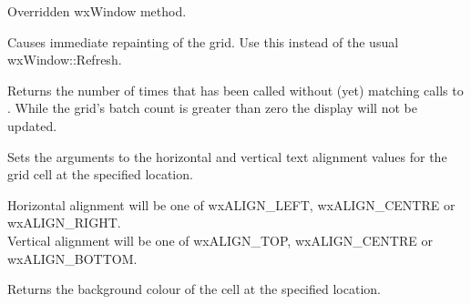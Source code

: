 \label{wxgridfit}


Overridden wxWindow method.



\label{wxgridforcerefresh}


Causes immediate repainting of the grid. Use this instead of the usual wxWindow::Refresh.



\label{wxgridgetbatchcount}


Returns the number of times that  has been called
without (yet) matching calls to . While
the grid's batch count is greater than zero the display will not be updated.



\label{wxgridgetcellalignment}


Sets the arguments to the horizontal and vertical text alignment values for the
grid cell at the specified location.

Horizontal alignment will be one of wxALIGN\_LEFT, wxALIGN\_CENTRE or wxALIGN\_RIGHT. \\
Vertical alignment will be one of wxALIGN\_TOP, wxALIGN\_CENTRE or wxALIGN\_BOTTOM.




\label{wxgridgetcellbackgroundcolour}


Returns the background colour of the cell at the specified location.



\label{wxgridgetcelleditor}


